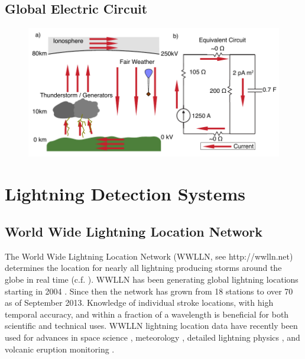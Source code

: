 \subsection{Global Electric Circuit}

\begin{figure}[ht!]
	\centering
	\includegraphics[scale=1]{Introduction/Figures/Global_Circuit.pdf}\\
	\caption{}
	\label{intro:fig:gec}
\end{figure}


\section{Lightning Detection Systems}


\subsection{World Wide Lightning Location Network}


The World Wide Lightning Location Network (WWLLN, see http://wwlln.net) determines the location for nearly all lightning producing storms around the globe in real time (c.f. \citet{Jacobson2006c}).
WWLLN has been generating global lightning locations starting in 2004 \citep{Rodger2006, Rodger2009}.
Since then the network has grown from 18 stations to over 70 as of September 2013.
Knowledge of individual stroke locations, with high temporal accuracy, and within a fraction of a wavelength is beneficial for both scientific and technical uses.
WWLLN lightning location data have recently been used for advances in space science \citep{Lay2007, Kumar2009, Collier2009, Holzworth2011, Jacobson2011}, meteorology \citep{Price2009,Thomas2010d}, detailed lightning physics \citep{Connaughton2010}, and volcanic eruption monitoring \citep{Doughton2010}.

